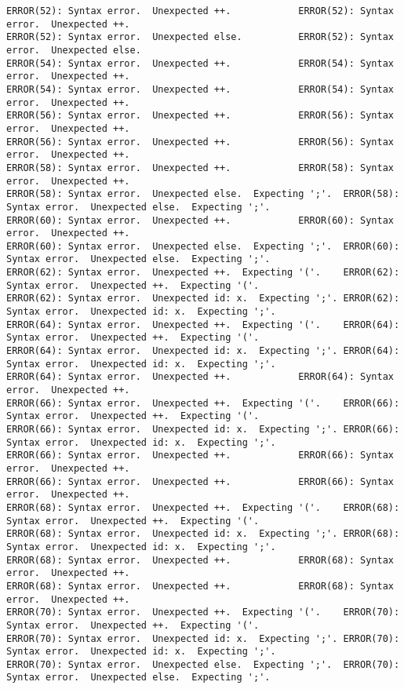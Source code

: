 \documentclass[12pt]{book}
\begin{document}
\begin{lstlisting}
ERROR(52): Syntax error.  Unexpected ++.			ERROR(52): Syntax error.  Unexpected ++.
ERROR(52): Syntax error.  Unexpected else.			ERROR(52): Syntax error.  Unexpected else.
ERROR(54): Syntax error.  Unexpected ++.			ERROR(54): Syntax error.  Unexpected ++.
ERROR(54): Syntax error.  Unexpected ++.			ERROR(54): Syntax error.  Unexpected ++.
ERROR(56): Syntax error.  Unexpected ++.			ERROR(56): Syntax error.  Unexpected ++.
ERROR(56): Syntax error.  Unexpected ++.			ERROR(56): Syntax error.  Unexpected ++.
ERROR(58): Syntax error.  Unexpected ++.			ERROR(58): Syntax error.  Unexpected ++.
ERROR(58): Syntax error.  Unexpected else.  Expecting ';'.	ERROR(58): Syntax error.  Unexpected else.  Expecting ';'.
ERROR(60): Syntax error.  Unexpected ++.			ERROR(60): Syntax error.  Unexpected ++.
ERROR(60): Syntax error.  Unexpected else.  Expecting ';'.	ERROR(60): Syntax error.  Unexpected else.  Expecting ';'.
ERROR(62): Syntax error.  Unexpected ++.  Expecting '('.	ERROR(62): Syntax error.  Unexpected ++.  Expecting '('.
ERROR(62): Syntax error.  Unexpected id: x.  Expecting ';'.	ERROR(62): Syntax error.  Unexpected id: x.  Expecting ';'.
ERROR(64): Syntax error.  Unexpected ++.  Expecting '('.	ERROR(64): Syntax error.  Unexpected ++.  Expecting '('.
ERROR(64): Syntax error.  Unexpected id: x.  Expecting ';'.	ERROR(64): Syntax error.  Unexpected id: x.  Expecting ';'.
ERROR(64): Syntax error.  Unexpected ++.			ERROR(64): Syntax error.  Unexpected ++.
ERROR(66): Syntax error.  Unexpected ++.  Expecting '('.	ERROR(66): Syntax error.  Unexpected ++.  Expecting '('.
ERROR(66): Syntax error.  Unexpected id: x.  Expecting ';'.	ERROR(66): Syntax error.  Unexpected id: x.  Expecting ';'.
ERROR(66): Syntax error.  Unexpected ++.			ERROR(66): Syntax error.  Unexpected ++.
ERROR(66): Syntax error.  Unexpected ++.			ERROR(66): Syntax error.  Unexpected ++.
ERROR(68): Syntax error.  Unexpected ++.  Expecting '('.	ERROR(68): Syntax error.  Unexpected ++.  Expecting '('.
ERROR(68): Syntax error.  Unexpected id: x.  Expecting ';'.	ERROR(68): Syntax error.  Unexpected id: x.  Expecting ';'.
ERROR(68): Syntax error.  Unexpected ++.			ERROR(68): Syntax error.  Unexpected ++.
ERROR(68): Syntax error.  Unexpected ++.			ERROR(68): Syntax error.  Unexpected ++.
ERROR(70): Syntax error.  Unexpected ++.  Expecting '('.	ERROR(70): Syntax error.  Unexpected ++.  Expecting '('.
ERROR(70): Syntax error.  Unexpected id: x.  Expecting ';'.	ERROR(70): Syntax error.  Unexpected id: x.  Expecting ';'.
ERROR(70): Syntax error.  Unexpected else.  Expecting ';'.	ERROR(70): Syntax error.  Unexpected else.  Expecting ';'.

\end{lstlisting}
\end{document}
